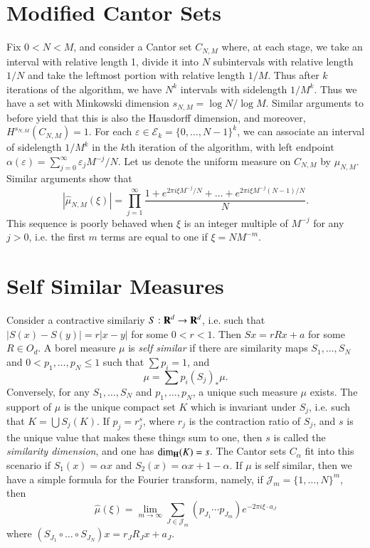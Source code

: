\section{Modified Cantor Sets}

Fix $0 < N < M$, and consider a Cantor set $C_{N,M}$ where, at each stage, we take an interval with relative length 1, divide it into $N$ subintervals with relative length $1/N$ and take the leftmost portion with relative length $1/M$. Thus after $k$ iterations of the algorithm, we have $N^k$ intervals with sidelength $1/M^k$. Thus we have a set with Minkowski dimension $s_{N,M} = \log N / \log M$. Similar arguments to before yield that this is also the Hausdorff dimension, and moreover, $H^{s_{N,M}}(C_{N,M}) = 1$. For each $\varepsilon \in \mathcal{E}_k = \{ 0, \dots, N - 1 \}^k$, we can associate an interval of sidelength $1/M^k$ in the $k$th iteration of the algorithm, with left endpoint $\alpha(\varepsilon) = \sum_{j = 0}^\infty \varepsilon_j M^{-j} / N$. Let us denote the uniform measure on $C_{N,M}$ by $\mu_{N,M}$. Similar arguments show that
%
\[ |\widehat{\mu}_{N,M}(\xi)| = \prod_{j = 1}^\infty \frac{1 + e^{2 \pi i \xi M^{-j} / N} + \dots + e^{2 \pi i \xi M^{-j} (N-1) / N}}{N}. \]
%
This sequence is poorly behaved when $\xi$ is an integer multiple of $M^{-j}$ for any $j > 0$, i.e. the first $m$ terms are equal to one if $\xi = NM^{-m}$.

\section{Self Similar Measures}

Consider a contractive similariy $S: \operatorname{\mathbf{R}}^d \to \operatorname{\mathbf{R}}^d$, i.e. such that $|S(x) - S(y)| = r |x - y|$ for some $0 < r < 1$. Then $Sx = r Rx + a$ for some $R \in O_d$. A borel measure $\mu$ is \emph{self similar} if there are similarity maps $S_1,\dots,S_N$ and $0 < p_1,\dots,p_N \leq 1$ such that $\sum p_i = 1$, and
%
\[ \mu = \sum p_i (S_j)_* \mu. \]
%
Conversely, for any $S_1,\dots,S_N$ and $p_1,\dots,p_N$, a unique such measure $\mu$ exists. The support of $\mu$ is the unique compact set $K$ which is invariant under $S_j$, i.e. such that $K = \bigcup S_j(K)$. If $p_j = r_j^s$, where $r_j$ is the contraction ratio of $S_j$, and $s$ is the unique value that makes these things sum to one, then $s$ is called the \emph{similarity dimension}, and one has $\operatorname{\dim_{\mathbf{H}}}(K) = s$. The Cantor sets $C_\alpha$ fit into this scenario if $S_1(x) = \alpha x$ and $S_2(x) = \alpha x + 1 - \alpha$. If $\mu$ is self similar, then we have a simple formula for the Fourier transform, namely, if $\mathcal{J}_m = \{ 1, \dots, N \}^m$, then
%
\[ \widehat{\mu}(\xi) = \lim_{m \to \infty} \sum_{J \in \mathcal{J}_m} (p_{J_1} \cdots p_{J_m}) e^{-2 \pi i \xi \cdot a_J} \]
%
where $(S_{J_1} \circ \dots \circ S_{J_N}) x = r_J R_J x + a_J$.







